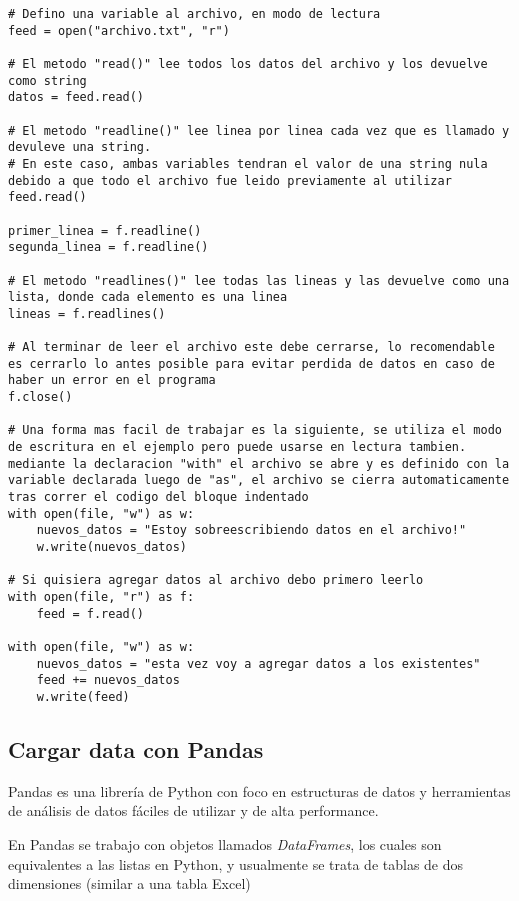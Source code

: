 \documentclass[10pt,a4paper]{article}
\begin{document}
\begin{lstlisting}[caption={Leer y escribir datos de un archivo}]
# Defino una variable al archivo, en modo de lectura
feed = open("archivo.txt", "r")

# El metodo "read()" lee todos los datos del archivo y los devuelve como string
datos = feed.read()

# El metodo "readline()" lee linea por linea cada vez que es llamado y devuleve una string.
# En este caso, ambas variables tendran el valor de una string nula debido a que todo el archivo fue leido previamente al utilizar feed.read()

primer_linea = f.readline()
segunda_linea = f.readline()

# El metodo "readlines()" lee todas las lineas y las devuelve como una lista, donde cada elemento es una linea
lineas = f.readlines()

# Al terminar de leer el archivo este debe cerrarse, lo recomendable es cerrarlo lo antes posible para evitar perdida de datos en caso de haber un error en el programa
f.close()

# Una forma mas facil de trabajar es la siguiente, se utiliza el modo de escritura en el ejemplo pero puede usarse en lectura tambien. mediante la declaracion "with" el archivo se abre y es definido con la variable declarada luego de "as", el archivo se cierra automaticamente tras correr el codigo del bloque indentado
with open(file, "w") as w:
    nuevos_datos = "Estoy sobreescribiendo datos en el archivo!"
    w.write(nuevos_datos)

# Si quisiera agregar datos al archivo debo primero leerlo
with open(file, "r") as f:
    feed = f.read()

with open(file, "w") as w:
    nuevos_datos = "esta vez voy a agregar datos a los existentes"
    feed += nuevos_datos
    w.write(feed) 
\end{lstlisting}
\subsection{Cargar data con Pandas}
Pandas es una librería de Python con foco en estructuras de datos y herramientas de análisis de datos fáciles de utilizar y de alta performance.\cite{pandas}

En Pandas se trabajo con objetos llamados \emph{DataFrames}, los cuales son equivalentes a las listas en Python, y usualmente se trata de tablas de dos dimensiones (similar a una tabla Excel)
\subsubsection{}
\end{document}
